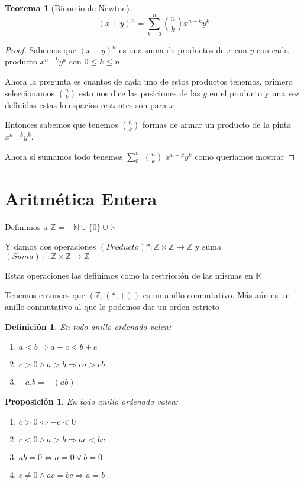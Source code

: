 \documentclass{article}
\theoremstyle{break}
\newtheorem{theorem}{Teorema}[section]
\newtheorem{proposition}{Proposición}
\newtheorem{definition}{Definición}[section]
\def \R{\mathbb{R}}
\def \N{\mathbb{N}}
\def \Z{\mathbb{Z}}
\begin{document}
    \begin{theorem}[Binomio de Newton]
 
    \[(x+y)^n = \sum_{k=0}^{n} \binom{n}{k}  x^{n-k}y^k \]
    \end{theorem}        

    \begin{proof}
        Sabemos que $(x+y)^n$ es una suma de productos de $x$ con $y$ con cada producto $x^{n-k}y^k$ con $0 \leq k \leq n$

	Ahora la pregunta es cuantos de cada uno de estos productos tenemos, primero seleccionamos $\binom{n}{k}$ esto nos dice
        las posiciones de las $y$ en el producto y una vez definidas estas lo espacios restantes son para $x$

	Entonces sabemos que tenemos $\binom{n}{k}$ formas de armar un producto de la pinta $x^{n-k}y^k$.

	Ahora si sumamos todo tenemos $\sum_{0}^{n}$ $\binom{n}{k}$ $x^{n-k}y^k$ como queríamos mostrar
    \end{proof}

    \section{Aritmética Entera}    

    Definimos a $\Z = -\N \cup \{0\} \cup \N$

    Y damos dos operaciones $(Producto) *: \Z\times \Z \rightarrow \Z$ y suma $(Suma) +: \Z\times \Z \rightarrow \Z$

    Estas operaciones las definimos como la restricción de las mismas en $\R$

    Tenemos entonces que $(\Z,(*,+))$ es un anillo conmutativo. Más aún es un anillo conmutativo al que le podemos dar un orden estricto
    \newpage
    \begin{definition}
        En todo anillo ordenado valen:
        \begin{enumerate}
        \item $a<b \Rightarrow a +c < b + c$
        \item $c>0 \land a >b \Rightarrow ca > cb$
        \item $-a.b = -(ab)$
        \end{enumerate}
    \end{definition}
     

    \begin{proposition}
        En todo anillo ordenado valen:
        \begin{enumerate}
            \item $c>0 \iff -c <0$
            \item $c<0 \land a >b \Rightarrow ac < bc$
            \item $ab=0 \iff a=0\lor b=0$
            \item $c\neq 0 \land ac = bc \Rightarrow a = b$
        \end{enumerate}
    \end{proposition}
\end{document}
